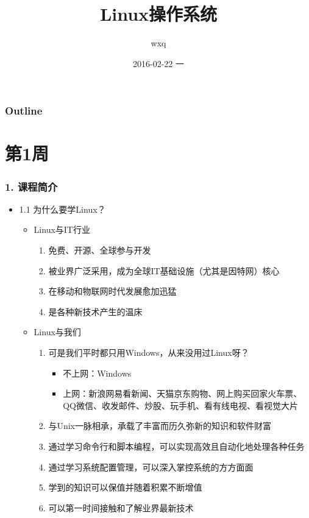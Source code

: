 \documentclass[bigger]{beamer}
\title{Linux操作系统}
\author{wxq}
\date{2016-02-22 一}
\begin{document}
\maketitle

\begin{frame}
\frametitle{Outline}
\setcounter{tocdepth}{3}
\tableofcontents
\end{frame}

\section{第1周}
\label{sec-1}
\begin{frame}[fragile]
\frametitle{1. 课程简介}
\label{sec-1-1}
\begin{itemize}

\item 1.1 为什么要学Linux？
\label{sec-1-1-1}%
\begin{itemize}
\item Linux与IT行业
\begin{enumerate}
\item 免费、开源、全球参与开发
\item 被业界广泛采用，成为全球IT基础设施（尤其是因特网）核心
\item 在移动和物联网时代发展愈加迅猛
\item 是各种新技术产生的温床
\end{enumerate}
\item Linux与我们
\begin{enumerate}
\item 可是我们平时都只用Windows，从来没用过Linux呀？
\begin{itemize}
\item 不上网：Windows
\item 上网：新浪网易看新闻、天猫京东购物、网上购买回家火车票、QQ微信、收发邮件、炒股、玩手机、看有线电视、看视觉大片
\end{itemize}
\item 与Unix一脉相承，承载了丰富而历久弥新的知识和软件财富
\item 通过学习命令行和脚本编程，可以实现高效且自动化地处理各种任务
\item 通过学习系统配置管理，可以深入掌控系统的方方面面
\item 学到的知识可以保值并随着积累不断增值
\item 可以第一时间接触和了解业界最新技术
\end{enumerate}
\end{itemize}


\end{itemize}
\end{frame}
\end{document}
